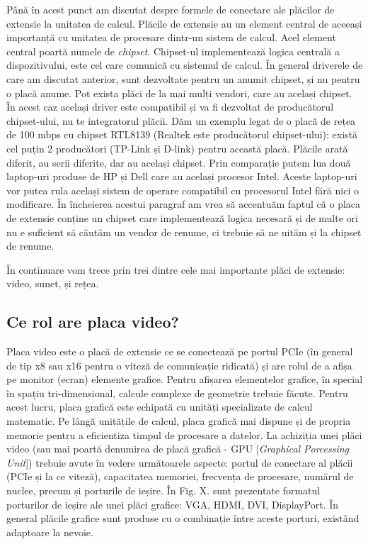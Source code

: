 Până în acest punct am discutat despre formele de conectare ale plăcilor de
extensie la unitatea de calcul. Plăcile de extensie au un element central de
aceeași importanță cu unitatea de procesare dintr-un sistem de calcul. Acel
element central poartă numele de \textit{chipset}. Chipset-ul implementează logica
centrală a dispozitivului, este cel care comunică cu sistemul de calcul. În
general driverele de care am discutat anterior, sunt dezvoltate pentru un anumit
chipset, și nu pentru o placă anume. Pot exista plăci de la mai mulți vendori,
care au același chipset. În acest caz același driver este compatibil și va fi
dezvoltat de producătorul chipset-ului, nu te integratorul plăcii. Dăm un
exemplu legat de o placă de rețea de 100 mbps cu chipset RTL8139 (Realtek este
producătorul chipset-ului): există cel puțin 2 producători (TP-Link și D-link)
pentru această placă. Plăcile arată diferit, au serii diferite, dar au același
chipset. Prin comparație putem lua două laptop-uri produse de HP și Dell care au
același procesor Intel. Aceste laptop-uri vor putea rula același sistem de
operare compatibil cu procesorul Intel fără nici o modificare. În încheierea
acestui paragraf am vrea să accentuăm faptul că o placa de extensie conține un
chipset care implementează logica necesară și de multe ori nu e suficient să
căutăm un vendor de renume, ci trebuie să ne uităm și la chipset de renume.


În continuare vom trece prin trei dintre cele mai importante plăci de extensie:
video, sunet, și rețea.


\subsection{Ce rol are placa video?}
\label{sec:hardware-extensii-gpu}

Placa video este o placă de extensie ce se conectează pe portul PCIe (în general
de tip x8 sau x16 pentru o viteză de comunicație ridicată) și are rolul de a
afișa pe monitor (ecran) elemente grafice. Pentru afișarea elementelor grafice,
în special în spațiu tri-dimensional, calcule complexe de geometrie trebuie
făcute. Pentru acest lucru, placa grafică este echipată cu unități specializate
de calcul matematic. Pe lângă unitățile de calcul, placa grafică mai dispune și
de propria memorie pentru a eficientiza timpul de procesare a datelor. La
achiziția unei plăci video (sau mai poartă denumirea de placă grafică - GPU
[\textit{Graphical Porcessing Unit}]) trebuie avute în vedere următoarele aspecte: portul
de conectare al plăcii (PCIe și la ce viteză), capacitatea memoriei, frecvența
de procesare, numărul de nuclee, precum și porturile de ieșire. În Fig. X. sunt
prezentate formatul porturilor de ieșire ale unei plăci grafice: VGA, HDMI, DVI,
DisplayPort. În general plăcile grafice sunt produse cu o combinație între
aceste porturi, existând adaptoare la nevoie.

